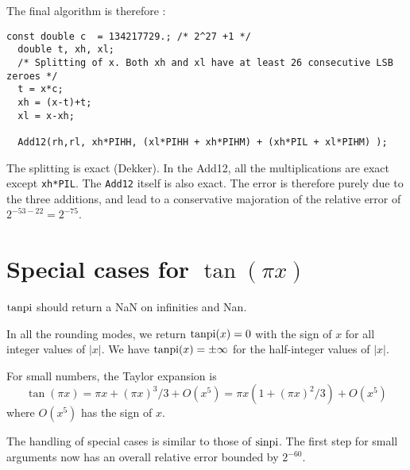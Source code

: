 The final algorithm is therefore :
\begin{lstlisting}[caption={Multiplication by $\pi$ \label{lst:trigpi:pix}},firstnumber=1]
  const double c  = 134217729.; /* 2^27 +1 */   
  double t, xh, xl;                           
  /* Splitting of x. Both xh and xl have at least 26 consecutive LSB zeroes */
  t = x*c;     
  xh = (x-t)+t;
  xl = x-xh;   

  Add12(rh,rl, xh*PIHH, (xl*PIHH + xh*PIHM) + (xh*PIL + xl*PIHM) );               
\end{lstlisting}

The splitting is exact (Dekker). In the Add12, all the multiplications
are exact except \texttt{xh*PIL}. The \texttt{Add12} itself is also
exact. The error is therefore purely due to the three additions, and
lead to a conservative majoration of the relative error of $2^{-53-22}
= 2^{-75}$. 



\section{Special cases for $\tan(\pi x)$}
$\operatorname{tanpi}$ should return a NaN on infinities and Nan.

In all the rounding modes, we return $\operatorname{tanpi}(x)=0$ with the sign of $x$ for all
integer values of $|x|$. We have $\operatorname{tanpi}(x)=\pm \infty$ for  the half-integer
values of $|x|$. 

For small numbers, the Taylor expansion is
\begin{equation}
  \tan(\pi x) = \pi x + (\pi x)^3/3 + O(x^5) 
  = \pi x(1+(\pi x)^2/3) + O(x^5)\label{eq:tanpiTaylor}
\end{equation}
where $O(x^5)$ has the sign of $x$. 

The handling of special cases is similar to those of $\operatorname{sinpi}$. The
first step for small arguments now has an overall relative error
bounded by $2^{-60}$.
 



